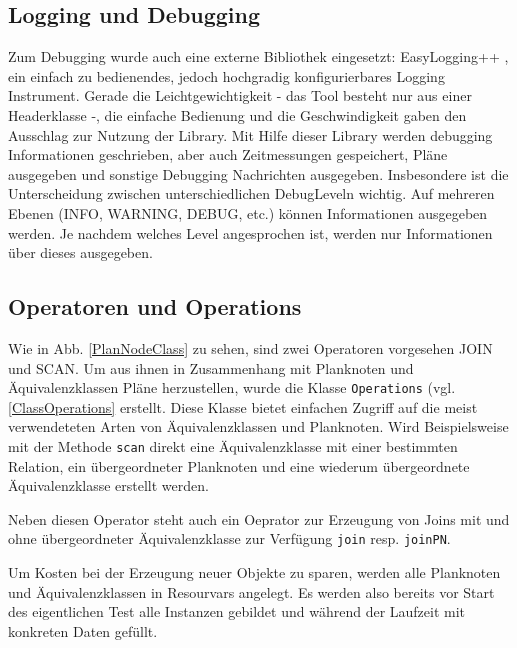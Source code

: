 \subsection{Logging und Debugging}
Zum Debugging wurde auch eine externe Bibliothek eingesetzt: EasyLogging++ \cite{easylogging}, ein einfach zu bedienendes, jedoch hochgradig konfigurierbares Logging Instrument. Gerade die Leichtgewichtigkeit - das Tool besteht nur aus einer Headerklasse -, die einfache Bedienung und die Geschwindigkeit gaben  den Ausschlag zur Nutzung der Library. Mit Hilfe dieser Library werden debugging Informationen geschrieben, aber auch Zeitmessungen gespeichert, Pläne ausgegeben und sonstige Debugging Nachrichten ausgegeben. Insbesondere ist die Unterscheidung zwischen unterschiedlichen Debug\-Leveln wichtig. Auf mehreren Ebenen (INFO, WARNING, DEBUG, etc.) können Informationen ausgegeben werden. Je nachdem welches Level angesprochen ist, werden nur Informationen über dieses ausgegeben. 

\subsection{Operatoren und Operations}
Wie in Abb. \ref{PlanNodeClass} zu sehen, sind zwei Operatoren vorgesehen JOIN und SCAN. Um aus ihnen in Zusammenhang mit Planknoten und Äquivalenzklassen Pläne herzustellen, wurde die Klasse \texttt{Operations} (vgl. \ref{ClassOperations} erstellt. Diese Klasse bietet einfachen Zugriff auf die meist verwendeteten Arten von Äquivalenzklassen und Planknoten. Wird Beispielsweise mit der Methode \texttt{scan} direkt eine Äquivalenzklasse mit einer bestimmten Relation, ein übergeordneter Planknoten und eine wiederum übergeordnete Äquivalenzklasse erstellt werden.

Neben diesen Operator steht auch ein Oeprator zur Erzeugung von Joins mit und ohne übergeordneter Äquivalenzklasse zur Verfügung \texttt{join} resp. \texttt{joinPN}.

Um Kosten bei der Erzeugung neuer Objekte zu sparen, werden alle Planknoten und Äquivalenzklassen in Resourvars angelegt. Es werden also bereits vor Start des eigentlichen Test alle Instanzen gebildet und während der Laufzeit mit konkreten Daten gefüllt.

